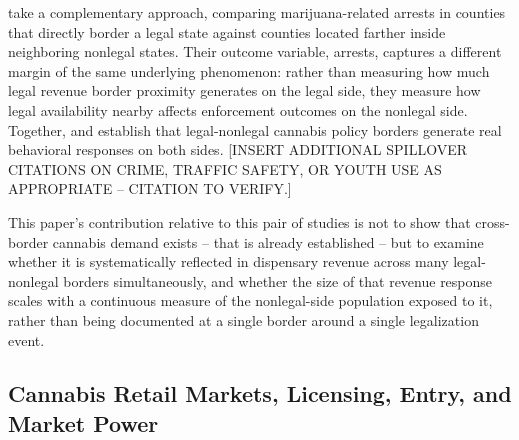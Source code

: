 \documentclass[12pt]{article}
\begin{document}
\citet{HaoCowan2020} take a complementary approach, comparing marijuana-related arrests in counties that
directly border a legal state against counties located farther inside neighboring nonlegal states. Their
outcome variable, arrests, captures a different margin of the same underlying phenomenon: rather than
measuring how much legal revenue border proximity generates on the legal side, they measure how legal
availability nearby affects enforcement outcomes on the nonlegal side. Together, \citet{HansenMillerWeber2020}
and \citet{HaoCowan2020} establish that legal-nonlegal cannabis policy borders generate real behavioral
responses on both sides. [INSERT ADDITIONAL SPILLOVER CITATIONS ON CRIME, TRAFFIC SAFETY, OR YOUTH USE AS
APPROPRIATE -- CITATION TO VERIFY.]

This paper's contribution relative to this pair of studies is not to show that cross-border cannabis
demand exists -- that is already established -- but to examine whether it is systematically reflected in
dispensary revenue across many legal-nonlegal borders simultaneously, and whether the size of that revenue
response scales with a continuous measure of the nonlegal-side population exposed to it, rather than being
documented at a single border around a single legalization event.

\subsection{Cannabis Retail Markets, Licensing, Entry, and Market Power}
\end{document}
